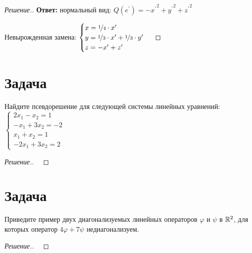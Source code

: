 \documentclass[a4paper]{article}
\theoremstyle{remark}
\newcommand{\eq}[1]{\begin{cases} #1 \end{cases}}
\begin{document}
\begin{proof}[Решение.]
            \textbf{Ответ:} нормальный вид: $Q(e^\prime) = -{x^\prime}^2 + {y^\prime}^2 + {z^\prime}^2$

            Невырожденная замена: 
            $\eq{
                x = \nicefrac14 \cdot x^\prime \\
                y = \nicefrac13 \cdot x^\prime + \nicefrac13 \cdot y^\prime \\
                z = -x^\prime + z^\prime
            }
            $

        \end{proof}

    \section*{Задача }
        Найдите псевдорешение для следующей системы линейных уравнений: 
        $\eq{
            2x_1 - x_2 = 1\\
            -x_1 + 3x_2 = -2 \\
            x_1 + x_2 = 1 \\
            -2x_1 + 3x_2 = 2
        }$
        \begin{proof}[Решение.] \ 
            

        \end{proof}
    
    \section*{Задача }
        Приведите пример двух диагонализуемых линейных операторов $\varphi$ и 
        $\psi$ в $\mathbb{R}^2$, для которых оператор $4\varphi + 7\psi$ недиагонализуем.
        \begin{proof}[Решение.] \ 
            

        \end{proof}
    
\end{document}
